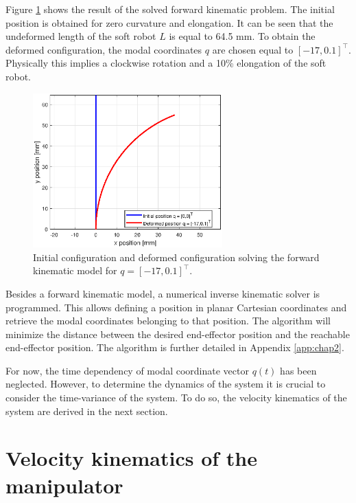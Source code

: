 Figure \ref{fig1:forward_kinematic} shows the result of the solved forward kinematic problem. The initial position is obtained for zero curvature and elongation. It can be seen that the undeformed length of the soft robot $L$ is equal to 64.5 mm. To obtain the deformed configuration, the modal coordinates $q$ are chosen equal to $[-17,0.1]^\top$. Physically this implies a clockwise rotation and a 10\% elongation of the soft robot.


\begin{figure}[H]
    \centering
    \includegraphics[width = 0.65\textwidth]{Figures/Chapter2/fkin1701.eps}
    \caption{Initial configuration and deformed configuration solving the forward kinematic model for $q = [-17,0.1]^\top$.}
    \label{fig1:forward_kinematic}
\end{figure}



Besides a forward kinematic model, a numerical inverse kinematic solver is programmed. This allows defining a position in planar Cartesian coordinates and retrieve the modal coordinates belonging to that position. The algorithm will minimize the distance between the desired end-effector position and the reachable end-effector position. The algorithm is further detailed in Appendix \ref{app:chap2}. 

For now, the time dependency of modal coordinate vector $q(t)$ has been neglected. However, to determine the dynamics of the system it is crucial to consider the time-variance of the system. To do so, the velocity kinematics of the system are derived in the next section.


\section{Velocity kinematics of the manipulator}

